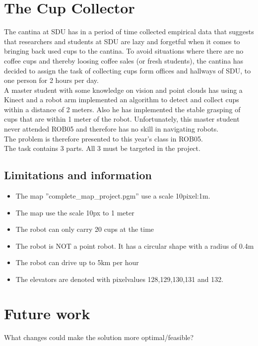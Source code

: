 \documentclass[11pt,a4paper]{article}
\begin{document}
\section{The Cup Collector}
The cantina at SDU has in a period of time collected empirical data that suggests that researchers and students at SDU are lazy and forgetful when it comes to bringing back used cups to the cantina. To avoid situations where there are no coffee cups and thereby loosing coffee sales (or fresh students), the cantina has decided to assign the task of collecting cups form offices and hallways of SDU, to one person for 2 hours per day.\\[0.2cm]
A master student with some knowledge on vision and point clouds has using a Kinect and a robot arm implemented an algorithm to detect and collect cups within a distance of 2 meters. Also he has implemented the stable grasping of cups that are within 1 meter of the robot. Unfortunately, this master student never attended ROB05 and therefore has no skill in navigating robots.\\[0.2cm]
The problem is therefore presented to this year’s class in ROB05.\\[0.2cm]
The task contains 3 parts. All 3 must be targeted in the project.

\subsection{Limitations and information}
\begin{itemize}
\item The map ”complete\_map\_project.pgm” use a scale 10pixel:1m. 
\item The map use the scale 10px to 1 meter
\item The robot can only carry 20 cups at the time
\item The robot is NOT a point robot. It has a circular shape with a radius of 0.4m
\item The robot can drive up to 5km per hour
\item The elevators are denoted with pixelvalues 128,129,130,131 and 132.
\end{itemize}
\newpage


\newpage


\newpage


\newpage

\section{Future work}
What changes could make the solution more optimal/feasible?
\end{document}
